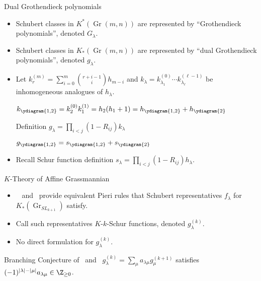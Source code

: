 \documentclass{beamer}
\DeclareMathOperator{\Gr}{Gr}
\begin{document}
  \begin{frame}{Dual Grothendieck polynomials}
    \begin{itemize}
    \item Schubert classes in \(K^*(\Gr(m,n))\) are represented by
      ``Grothendieck polynomials'', denoted \(G_\lambda\).
    \item Schubert classes in \(K_*(\Gr(m,n))\) are represented by
      ``dual Grothendieck polynomials'', denoted \(g_\lambda\).
    \item Let \(k^{(m)}_r = \sum_{i=0}^m \binom{r+i-1}{i} h_{m-i}\)
      and \(k_\lambda = k^{(0)}_{\lambda_1} \cdots
      k^{(\ell-1)}_{\lambda_\ell}\) be inhomogeneous analogues of
      \(h_\lambda\).

      \(k_{\ydiagram{1,2}} = k_2^{(0)}k_1^{(1)} = h_2(h_1+1) = h_{\ydiagram{1,2}} + h_{\ydiagram{2}} \)

      \begin{block}{Definition}
        \(g_\lambda = \prod_{i < j} (1-R_{ij})k_\lambda\)
      \end{block}
      \(g_{\ydiagram{1,2}} = s_{\ydiagram{1,2}} + s_{\ydiagram{2}}\)
    \item Recall Schur function definition \(s_\lambda = \prod_{i < j}
      (1-R_{ij})h_\lambda\).
    \end{itemize}
  \end{frame}
  \begin{frame}{\(K\)-Theory of Affine Grassmannian}
  \begin{itemize}
  \item~\cite{lss} and~\cite{morse} provide equivalent Pieri rules
    that Schubert representatives \(f_\lambda\) for \(K_*(\Gr_{SL_{k+1}})\) satisfy.
  \item Call such representatives \(K\)-\(k\)-Schur functions, denoted
    \(g_\lambda^{(k)}\).
  \item No direct formulation for \(g_\lambda^{(k)}\).
  \end{itemize}
  \begin{block}{Branching Conjecture of~\cite{lss} and~\cite{morse}}
    \(g_\lambda^{(k)} = \sum_\mu a_{\lambda \mu} g_\mu^{(k+1)}\)
    satisfies \((-1)^{|\lambda|-|\mu|}a_{\lambda \mu} \in \Z_{\geq 0}\).
  \end{block}
\end{frame}
\end{document}
